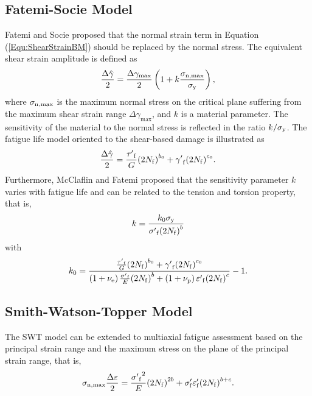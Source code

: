 \documentclass[preprint,5p,twocolumn,11pt,sort&compress]{elsarticle}
\begin{document}
\subsection{Fatemi-Socie Model}
Fatemi and Socie \cite{Fatemi1988} proposed that the normal strain term in Equation (\ref{Equ:ShearStrainBM}) should be replaced by the normal stress.
The equivalent shear strain amplitude is defined as
\begin{equation}
\frac{{\Delta \hat \gamma }}{2} = \frac{{\Delta {\gamma _{\max }}}}{2}\left( {1 + k\frac{{{\sigma _{\rm n,\max}}}}{{{\sigma _{\rm y}}}}} \right),
\end{equation}
where
$\sigma _{\rm n,\max}$ is the maximum normal stress on the critical plane suffering from the maximum shear strain range $\Delta {\gamma _{\max}}$, and $k$ is a material parameter. The sensitivity of the material to the normal stress is reflected in the ratio $k/\sigma _{\rm y}$.
The fatigue life model oriented to the shear-based damage is illustrated as
\begin{equation}
\frac{{\Delta \hat \gamma }}{2} = \frac{{{{\tau '}_{\rm f}}}}{G}{\left( {2{N_{\rm f}}} \right)^{{b_0}}} + {{\gamma '}_{\rm f}}{\left( {2{N_{\rm f}}} \right)^{{c_0}}}.
\end{equation}
Furthermore, McClaflin and Fatemi \cite{McClaflin2004} proposed that the sensitivity parameter $k$ varies with fatigue life and can be related to the tension and torsion property, that is,
\begin{equation}
k =  \frac{{k_0 {\sigma _{\rm y}}}}{{{{\sigma '}_{\rm f}}{{\left( {2{N_{\rm f}}} \right)}^b}}}
\end{equation}
with
\[
k_0 =  {\frac{{\frac{{{{\tau '}_{\rm f}}}}{G}{{\left( {2{N_{\rm f}}} \right)}^{{b_0}}} + {{\gamma '}_{\rm f}}{{\left( {2{N_{\rm f}}} \right)}^{{c_0}}}}}{{\left( {1 + {\nu _{\rm e}}} \right)\frac{{{{\sigma '}_{\rm f}}}}{E}{{\left( {2{N_{\rm f}}} \right)}^b} + \left( {1 + {\nu _{\rm p}}} \right){{\varepsilon '}_{\rm f}}{{\left( {2{N_{\rm f}}} \right)}^c}}} - 1} .
\]


\subsection{Smith-Watson-Topper Model}
The SWT model \cite{smith1970stress} can be extended to multiaxial fatigue assessment based on the principal strain range and the maximum stress on the plane of the principal strain range, that is,
\[
{\sigma _{\rm n, \max}}\frac{{\Delta \varepsilon }}{2} = \frac{{{{\sigma '}_{\rm f}}^2}}{E}{\left( {2{N_{\rm f}}} \right)^{2b}} + {\sigma '_{\rm f}}{\varepsilon '_{\rm f}}{\left( {2{N_{\rm f}}} \right)^{b + c}}.
\]
\end{document}
